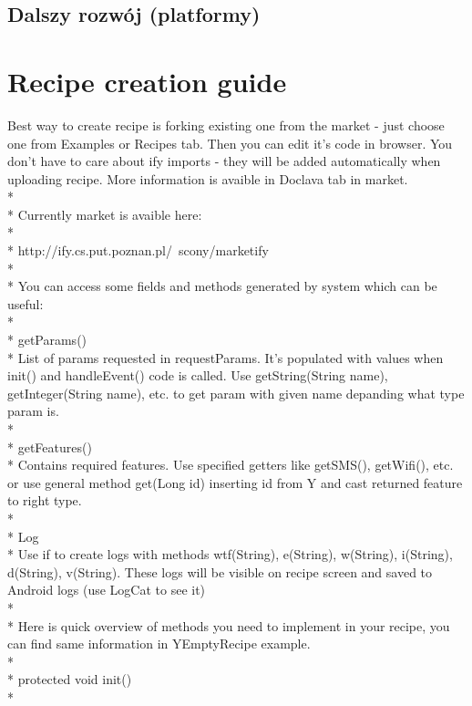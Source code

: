 \documentclass[11pt,a4paper,polish,thesis]{dcsbook}
\begin{document}
\section{Dalszy rozwój (platformy)}

\appendix 

\chapter{Recipe creation guide}

Best way to create recipe is forking existing one from the market - just choose one from Examples or Recipes tab. Then you can edit it's code in browser. You don't have to care about ify imports - they will be added automatically when uploading recipe. More information is avaible in Doclava tab in market. \\*\\*
Currently market is avaible here:\\*\\*
http://ify.cs.put.poznan.pl/~scony/marketify\\*\\*
You can access some fields and methods generated by system which can be useful:\\*\\*
getParams()\\*
List of params requested in requestParams. It's populated with values when init() and handleEvent() code is called. Use getString(String name), getInteger(String name), etc. to get param with given name depanding what type param is.\\*\\*
getFeatures()\\*
Contains required features. Use specified getters like getSMS(), getWifi(), etc. or use general method get(Long id) inserting id from Y and cast returned feature to right type.\\*\\*
Log\\*
Use if to create logs with methods wtf(String), e(String), w(String), i(String), d(String), v(String). These logs will be visible on recipe screen and saved to Android logs (use LogCat to see it)\\*\\*
Here is quick overview of methods you need to implement in your recipe, you can find same information in YEmptyRecipe example.\\*\\*
protected void init()\\*
\end{document}
